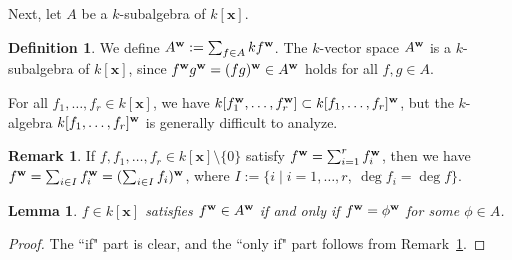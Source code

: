 \documentclass{amsart}
\theoremstyle{plain}
\newtheorem{lem}[thm]{Lemma}
\theoremstyle{definition}
\newtheorem{definition}[thm]{Definition}
\newtheorem{rem}[thm]{Remark}
\newcommand{\zs}{\{ 0\} }
\newcommand{\sm}{\setminus}
\newcommand{\x}{{\boldsymbol x}}
\newcommand{\w}{{\bf w}}
\newcommand{\kx}{k[\x]}
\begin{document}
Next, let $A$ be a $k$-subalgebra of $\kx $. 


\begin{definition}\rm 
We define $A^{\w }:=\sum _{f\in A}kf^{\w }$. 
The $k$-vector space $A^{\w }$ is a $k$-subalgebra of $\kx $, 
since $f^{\w }g^{\w }=(fg)^{\w }\in A^{\w }$ 
holds for all $f,g\in A$. 
\end{definition}


For all $f_1,\ldots ,f_r\in \kx $, 
we have 
$k[f_1^{\w },\ldots ,f_r^{\w }]\subset k[f_1,\ldots ,f_r]^{\w }$, 
but the $k$-algebra 
$k[f_1,\ldots ,f_r]^{\w }$ is generally difficult to analyze. 



\begin{rem}\label{rem:homogeneous}\rm 
If $f,f_1,\ldots ,f_r\in \kx \sm \zs $ satisfy 
$f^{\w }=\sum _{i=1}^rf_i^{\w }$, 
then we have 
$f^{\w }=\sum _{i\in I}f_i^{\w }=(\sum _{i\in I}f_i)^{\w }$, 
where $I:=\{ i\mid i=1,\ldots ,r,\ \deg f_i=\deg f\} $. 
\end{rem}



\begin{lem}\label{def:initial algebra}\rm 
$f\in \kx $ 
satisfies $f^{\w }\in A^{\w }$ 
if and only if $f^{\w }=\phi ^{\w }$ for some $\phi \in A$. 
\end{lem}

\begin{proof}
The ``if" part is clear, 
and the ``only if" part follows from  
Remark~\ref{rem:homogeneous}. 
\end{proof}
\end{document}
